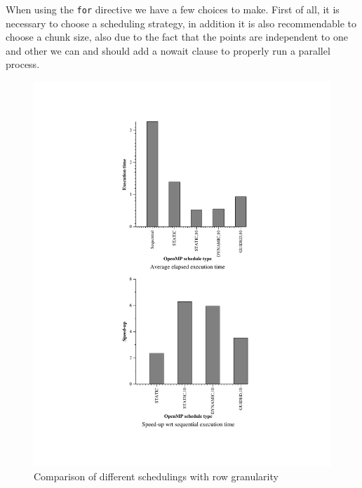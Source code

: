 \documentclass[11pt]{article}
\begin{document}
When using the \texttt{for} directive we have a few choices to make. First of all, it is necessary to choose a scheduling strategy, in addition it is also recommendable to choose a chunk size, also due to the fact that the points are independent to one and other we can and should add a nowait clause to properly run a parallel process. 

\begin{figure}[!htb]
  \begin{minipage}[t]{0.48\textwidth}
    \centerline{\includegraphics[width=1.5\linewidth]{./For/row/row.pdf}}
    \caption{Comparison of different schedulings with row granularity}
  \end{minipage}
  \begin{minipage}[t]{0.48\textwidth}

\end{minipage}
\end{figure}
\end{document}
